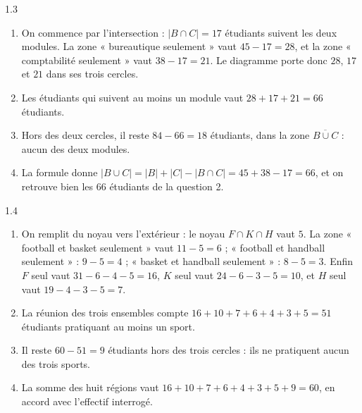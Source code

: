 \begin{corrige}{1.3}
\begin{enumerate}
\item On commence par l'intersection : $|B \cap C| = 17$ étudiants suivent les deux modules. La zone « bureautique seulement » vaut $45 - 17 = 28$, et la zone « comptabilité seulement » vaut $38 - 17 = 21$. Le diagramme porte donc $28$, $17$ et $21$ dans ses trois cercles.
\item Les étudiants qui suivent au moins un module vaut $28 + 17 + 21 = 66$ étudiants.
\item Hors des deux cercles, il reste $84 - 66 = 18$ étudiants, dans la zone $\overline{B \cup C}$ : aucun des deux modules.
\item La formule donne $|B \cup C| = |B| + |C| - |B \cap C| = 45 + 38 - 17 = 66$, et on retrouve bien les 66 étudiants de la question 2.
\end{enumerate}
\end{corrige}

\begin{corrige}{1.4}
\begin{enumerate}
\item On remplit du noyau vers l'extérieur : le noyau $F \cap K \cap H$ vaut $5$. La zone « football et basket seulement » vaut $11 - 5 = 6$ ; « football et handball seulement » : $9 - 5 = 4$ ; « basket et handball seulement » : $8 - 5 = 3$. Enfin $F$ seul vaut $31 - 6 - 4 - 5 = 16$, $K$ seul vaut $24 - 6 - 3 - 5 = 10$, et $H$ seul vaut $19 - 4 - 3 - 5 = 7$.
\item La réunion des trois ensembles compte $16 + 10 + 7 + 6 + 4 + 3 + 5 = 51$ étudiants pratiquant au moins un sport.
\item Il reste $60 - 51 = 9$ étudiants hors des trois cercles : ils ne pratiquent aucun des trois sports.
\item La somme des huit régions vaut $16 + 10 + 7 + 6 + 4 + 3 + 5 + 9 = 60$, en accord avec l'effectif interrogé.
\end{enumerate}
\end{corrige}

